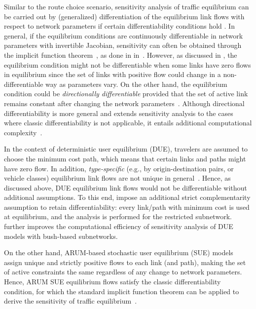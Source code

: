 \documentclass[a4paper,11pt]{article}
\begin{document}
Similar to the route choice scenario, sensitivity analysis of traffic equilibrium can be carried out by (generalized) differentiation of the equilibrium link flows with respect to network parameters if certain differentiability conditions hold \citep{robinson1985implicit, robinson2006strong}. In general, if the equilibrium conditions are continuously differentiable in network parameters with invertible Jacobian, sensitivity can often be obtained through the implicit function theorem~\citep{clarke1990optimization}, as done in  in~\cite{yang1997traffic,bell1999sensitivity,ying2001sensitivity,clark2002sensitivity}. However, as discussed in \cite{patriksson_sensitivity_2004}, the equilibrium condition might not be differentiable when some links have zero flows in equilibrium since the set of links with positive flow could change in a non-differentiable way as parameters vary. On the other hand, the equilibrium condition could be \textit{directionally differentiable} provided that the set of active link remains constant after changing the network parameters~\citep{ qiu1989sensitivity,kyparisis1990solution,patriksson_sensitivity_2004}. Although directional differentiability is more general and extends sensitivity analysis to the cases where classic differentiability is not applicable, it entails additional computational complexity~\citep{patriksson2003sensitivity,patriksson_sensitivity_2004,josefsson2007sensitivity}. 


In the context of deterministic user equilibrium (DUE), travelers are assumed to choose the minimum cost path, which means that certain links and paths might have zero flow. In addition, \textit{type-specific} (e.g., by origin-destination pairs, or vehicle classes) equilibrium link flows are not unique in general~\citep{sheffi1985urban}.
Hence, as discussed above, DUE equilibrium link flows would not be differentiable without additional assumptions. To this end, \cite{tobin1988sensitivity,yang2007sensitivity, cho2000reduction,chung2014sensitivity} impose an additional strict complementarity assumption to retain differentiability: every link/path with minimum cost is used at equilibrium, and the analysis is performed for the restricted subnetwork. \cite{boyles2012bush,jafari2016improved} further improves the computational efficiency of sensitivity analysis of DUE models with bush-based subnetworks.

On the other hand, ARUM-based stochastic user equilibrium (SUE) models~\citep[e.g.,][]{dial1971probabilistic,maher1997probit,bekhor2001stochastic, baillon2008markovian, kitthamkesorn2014unconstrained, oyama2022markovian} assign unique and strictly positive flows to each link (and path), making the set of active constraints the same regardless of any change to network parameters. Hence, ARUM SUE equilibrium flows satisfy the classic differentiability condition, for which the standard implicit function theorem can be applied to derive the sensitivity of traffic equilibrium~\citep[e.g.,][]{ying2005sensitivity,clark2006applications, yang2009sensitivity}.
\end{document}
